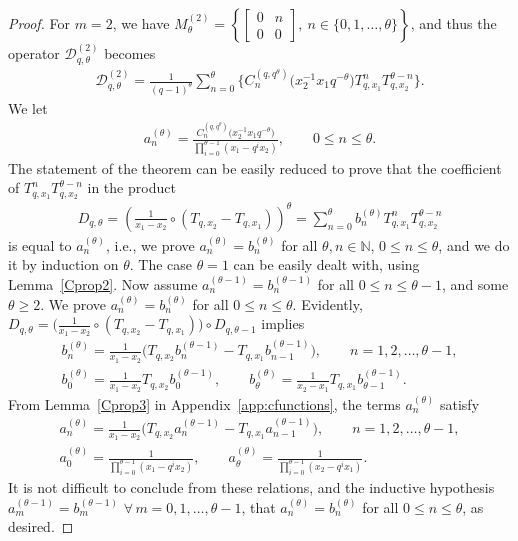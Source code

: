 \documentclass[pdftex]{sigma}
\numberwithin{equation}{section}
\newcommand{\N}{\mathbb{N}}
\newcommand{\DD}{\mathcal{D}}
\begin{document}
\begin{proof}
For $m = 2$, we have $M_{\theta}^{(2)} =\left\{ \left[
 \begin{smallmatrix}
 0 & n \\
 0 & 0
 \end{smallmatrix} \right], \ n\in\{0, 1, \dots, \theta\} \right\}$,
and thus the operator $\DD_{q, \theta}^{(2)}$ becomes
\begin{gather*}
\DD^{(2)}_{q, \theta} = \frac{1}{(q - 1)^{\theta}}\sum_{n = 0}^{\theta}\big\{{C_n^{(q, q^{\theta})}\big(x_{2}^{-1}x_1q^{-\theta} \big)} T_{q, x_1}^nT_{q, x_2}^{\theta - n}\big\}.
\end{gather*}
We let
\begin{gather*}
a_n^{(\theta)} = \frac{C_n^{(q, q^{\theta})}\big(x_2^{-1}x_1q^{-\theta}\big)}{\prod\limits_{i=0}^{\theta - 1}{(x_1 - q^ix_2)}}, \qquad 0\leq n\leq \theta.
\end{gather*}
The statement of the theorem can be easily reduced to prove that the coef\/f\/icient of $T_{q, x_1}^nT_{q, x_2}^{\theta - n}$ in the product
\begin{gather*}
D_{q, \theta} = \left(\frac{1}{x_1 - x_2} \circ (T_{q, x_2} - T_{q, x_1})\right)^{\theta} = \sum_{n=0}^{\theta}{b_n^{(\theta)}T_{q, x_1}^nT_{q, x_2}^{\theta-n}}
\end{gather*}
is equal to $a_n^{(\theta)}$, i.e., we prove $a_n^{(\theta)} = b_n^{(\theta)}$ for all $\theta, n\in\N$, $0 \leq n \leq \theta$, and we do it by induction on $\theta$. The case $\theta = 1$ can be easily dealt with, using Lemma~\ref{Cprop2}. Now assume $a_n^{(\theta - 1)} = b_n^{(\theta - 1)}$ for all $0\leq n \leq \theta - 1$, and some $\theta \geq 2$. We prove $a_n^{(\theta)} = b_n^{(\theta)}$ for all $0\leq n\leq \theta$. Evidently, $D_{q, \theta} = \big(\frac{1}{x_1 - x_2}\circ (T_{q, x_2} - T_{q, x_1})\big)\circ D_{q, \theta - 1}$ implies
\begin{gather*}
b_n^{(\theta)} = \frac{1}{x_1 - x_2}\big( T_{q, x_2} b_n^{(\theta - 1)} - T_{q, x_1} b_{n-1}^{(\theta - 1)} \big), \qquad n = 1, 2, \dots, \theta-1,\\
b_0^{(\theta)} = \frac{1}{x_1 - x_2} T_{q, x_2}b_0^{(\theta-1)}, \qquad b_{\theta}^{(\theta)} = \frac{1}{x_2 - x_1} T_{q, x_1}b_{\theta-1}^{(\theta-1)}.
\end{gather*}
From Lemma~\ref{Cprop3} in Appendix~\ref{app:cfunctions}, the terms $a_n^{(\theta)}$ satisfy
\begin{gather*}
a_n^{(\theta)} = \frac{1}{x_1 - x_2} \big( T_{q, x_2} a_n^{(\theta - 1)} - T_{q, x_1} a_{n-1}^{(\theta - 1)} \big), \qquad n = 1, 2, \dots, \theta-1,\\
a_0^{(\theta)} = \frac{1}{\prod\limits_{i=0}^{\theta - 1}{(x_1 - q^i x_2)}},\qquad a_{\theta}^{(\theta)} = \frac{1}{\prod\limits_{i=0}^{\theta - 1}{(x_2 - q^i x_1)}}.
\end{gather*}
It is not dif\/f\/icult to conclude from these relations, and the inductive hypothesis $a_m^{(\theta - 1)} = b_m^{(\theta - 1)}$ $\forall \, m = 0, 1, \dots, \theta-1$, that $a_n^{(\theta)} = b_n^{(\theta)}$ for all $0\leq n\leq\theta$, as desired.
\end{proof}
\end{document}
